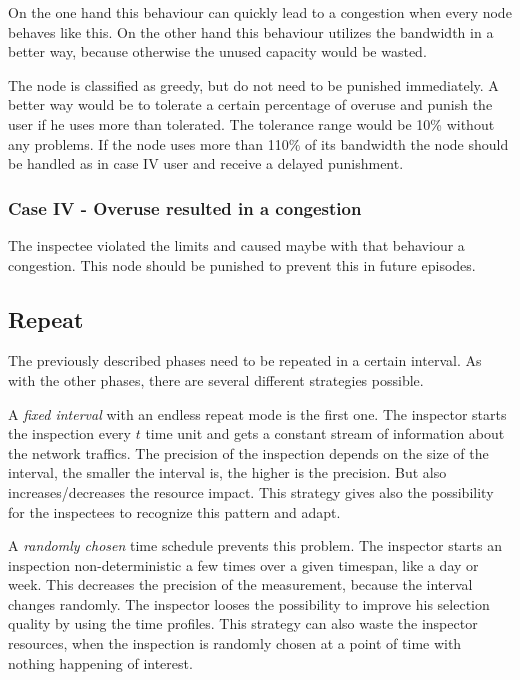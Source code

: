 \documentclass[thesis.tex]{subfiles}
\begin{document}
On the one hand this behaviour can quickly lead to a congestion when every node behaves like this. On the other hand this behaviour utilizes the bandwidth in a better way, because otherwise the unused capacity would be wasted.

The node is classified as greedy, but do not need to be punished immediately. A better way would be to tolerate a certain percentage of overuse and punish the user if he uses more than tolerated. The tolerance range would be 10\% without any problems. If the node uses more than 110\% of its bandwidth the node should be handled as in case IV user and receive a delayed punishment.


\subsubsection{Case IV - Overuse resulted in a congestion}
The inspectee violated the limits and caused maybe with that behaviour a congestion. This node should be punished to prevent this in future episodes.

\subsection{Repeat} \label{sec:main:repeatphase}

The previously described phases need to be repeated in a certain interval. As with the other phases, there are several different strategies possible.

A \textit{fixed interval} with an endless repeat mode is the first one. The inspector starts the inspection every $t$ time unit and gets a constant stream of information about the network traffics. The precision of the inspection depends on the size of the interval, the smaller the interval is, the higher is the precision. But also increases/decreases the resource impact. This strategy gives also the possibility for the inspectees to recognize this pattern and adapt.

A \textit{randomly chosen} time schedule prevents this problem. The inspector starts an inspection non-deterministic a few times over a given timespan, like a day or week. This decreases the precision of the measurement, because the interval changes randomly. The inspector looses the possibility to improve his selection quality by using the time profiles. This strategy can also waste the inspector resources, when the inspection is randomly chosen at a point of time with nothing happening of interest.
\end{document}

